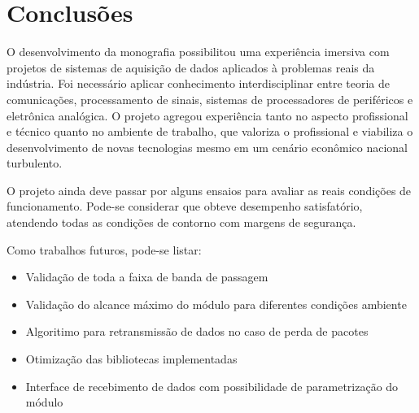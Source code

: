 \documentclass[
	12pt,				%
	openright,			%
	twoside,			%
	a4paper,			%
	english,			%
	french,				%
	spanish,			%
	brazil,				%
	]{abntex2}
\begin{document}
\chapter{Conclusões}

	O desenvolvimento da monografia possibilitou uma experiência imersiva com
	projetos de sistemas de aquisição de dados aplicados à problemas
	reais da indústria. Foi necessário aplicar conhecimento
	interdisciplinar entre teoria de comunicações, processamento de
	sinais, sistemas de processadores de periféricos e eletrônica
	analógica. O projeto agregou experiência tanto no aspecto
	profissional e técnico quanto no ambiente de trabalho, que valoriza
	o profissional e viabiliza o desenvolvimento de novas tecnologias
	mesmo em um cenário econômico nacional turbulento.

	O projeto ainda deve passar por alguns ensaios para avaliar as reais
	condições de funcionamento. Pode-se considerar que obteve desempenho satisfatório, atendendo
	todas as condições de contorno com margens de segurança.
	
	Como trabalhos futuros, pode-se listar:
	
	\begin{itemize}
		\item Validação de toda a faixa de banda de passagem
		\item Validação do alcance máximo do módulo para diferentes condições ambiente
		\item Algoritimo para retransmissão de dados no caso de perda de pacotes
		\item Otimização das bibliotecas implementadas
		\item Interface de recebimento de dados com possibilidade de parametrização do módulo
	\end{itemize}


% 

\postextual

% 


\end{document}
